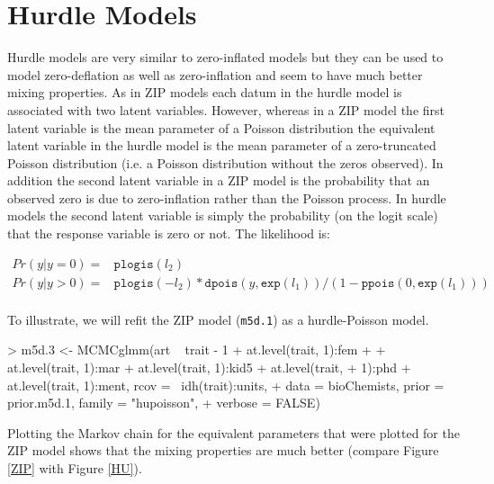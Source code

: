 \documentclass{article}
\begin{document}
\section{Hurdle Models}
\label{Hurdle}

Hurdle models are very similar to zero-inflated models but they can be used to model zero-deflation as well as zero-inflation and seem to have much better mixing properties.  As in ZIP models each datum in the hurdle model is associated with two latent variables. However, whereas in a ZIP model the first latent variable is the mean parameter of a Poisson distribution the equivalent latent variable in the hurdle model is the mean parameter of a zero-truncated Poisson distribution (i.e. a Poisson distribution without the zeros  observed). In addition the second latent variable in a ZIP model is the probability that an observed zero is due to zero-inflation rather than the Poisson process. In hurdle models the second latent variable is simply the probability (on the logit scale) that the response variable is zero or not. The likelihood is:

\begin{equation} 
\begin{array}{rl}
Pr(y | y=0) =& \texttt{plogis}(l_{2})\\
Pr(y | y>0) =& \texttt{plogis}(-l_{2})\ast \texttt{dpois}(y, \texttt{exp}(l_{1}))/(1-\texttt{ppois}(0, \texttt{exp}(l_{1})))\\
\end{array}
\end{equation}

To illustrate, we will refit the ZIP model (\texttt{m5d.1}) as a hurdle-Poisson model.

\begin{Schunk}
\begin{Sinput}
> m5d.3 <- MCMCglmm(art ~ trait - 1 + at.level(trait, 1):fem + 
+     at.level(trait, 1):mar + at.level(trait, 1):kid5 + at.level(trait, 
+     1):phd + at.level(trait, 1):ment, rcov = ~idh(trait):units, 
+     data = bioChemists, prior = prior.m5d.1, family = "hupoisson", 
+     verbose = FALSE)
\end{Sinput}
\end{Schunk}

Plotting the Markov chain for the equivalent parameters that were plotted for the ZIP model shows that the mixing properties are much better (compare Figure \ref{ZIP} with Figure \ref{HU}).
\end{document}
